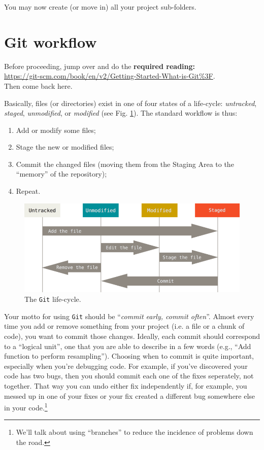 \documentclass[12pt,letterpaper]{article}
\begin{document}
You may now create (or move in) all your project sub-folders.




\section{Git workflow}
Before proceeding, jump over and do the \textbf{required reading:}\\
\url{https://git-scm.com/book/en/v2/Getting-Started-What-is-Git%3F}.\\
Then come back here.

Basically, files (or directories) exist in one of four states of a life-cycle: \emph{untracked}, \emph{staged}, \emph{unmodified}, or \emph{modified} (see Fig. \ref{fig:lifecycle}).
The standard workflow is thus:
\begin{enumerate}
	\item Add or modify some files;
	\item Stage the new or modified files;
	\item Commit the changed files (moving them from the Staging Area to the 
	``memory'' of the repository);
	\item Repeat.
\end{enumerate}

\begin{figure}
	\includegraphics[width=\linewidth]{figs/lifecycle}
	\caption{The \texttt{Git} life-cycle.}
	\label{fig:lifecycle}
\end{figure}

Your motto for using \texttt{Git} should be ``\emph{commit early, commit often}''.
Almost every time you add or remove something from your project (i.e. a file or 
a chunk of code), you want to commit those changes.
Ideally, each commit should correspond to a ``logical unit'', one that you are able to describe in a few words (e.g., ``Add function to perform resampling'').
Choosing when to commit is quite important, especially when you're debugging code.
For example, if you've discovered your code has two bugs, then you should 
commit each one of the fixes seperately, not together.
That way you can undo either fix independently if, for example, you messed up in one of your fixes or your fix created a different bug somewhere else in your code.\footnote{We'll talk about using ``branches'' to reduce the incidence of problems down the road.}
\end{document}
